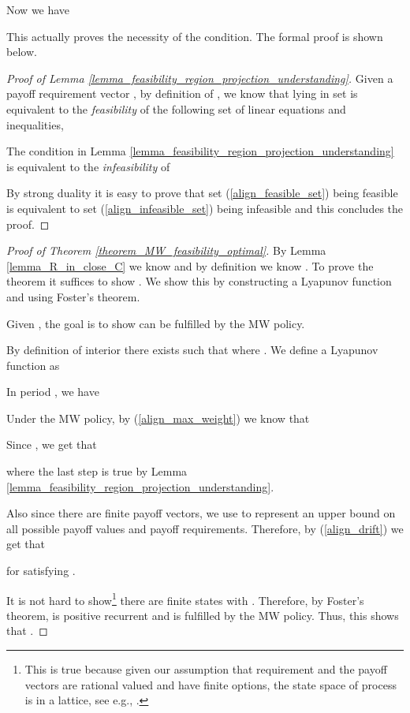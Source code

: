 \documentclass[prodmode,acmtompecs]{acmsmall}
\begin{document}
Now we have


This actually proves the necessity of the condition. The formal proof is shown below. 

\begin{proof}[Proof of Lemma \ref{lemma_feasibility_region_projection_understanding}]
Given a payoff requirement vector , by definition of , we know that  lying in set  is equivalent to the {\em feasibility} of the following set of linear equations and inequalities, 



The condition in Lemma \ref{lemma_feasibility_region_projection_understanding} is equivalent to the {\em infeasibility} of 


By strong duality \cite{BoV09} it is easy to prove that set (\ref{align_feasible_set}) being feasible is equivalent to set (\ref{align_infeasible_set}) being infeasible and this concludes the proof. 
\end{proof}

\begin{proof}[Proof of Theorem \ref{theorem_MW_feasibility_optimal}]
By Lemma \ref{lemma_R_in_close_C} we know  and by definition we know . To prove the theorem it suffices to show . We show this by constructing a Lyapunov function and using Foster's theorem. 

Given , the goal is to show  can be fulfilled by the MW policy. 

By definition of interior there exists  such that  where . We define a Lyapunov function as 


In period , we have


Under the MW policy, by (\ref{align_max_weight}) we know that


Since , we get that 

where the last step is true by Lemma \ref{lemma_feasibility_region_projection_understanding}. 

Also since there are finite payoff vectors, we use  to represent an upper bound on all possible payoff values and payoff requirements. 
Therefore, by (\ref{align_drift}) we get that

for  satisfying . 

It is not hard to show\footnote{This is true because given our assumption that requirement  and the payoff vectors are rational valued and have finite options, the state space of process  is in a lattice, see e.g., \cite{CoS13b}.} there are finite states  with . Therefore, by Foster's theorem,  is positive recurrent and  is fulfilled by the MW policy. 
Thus, this shows that . 
\end{proof}
\end{document}
